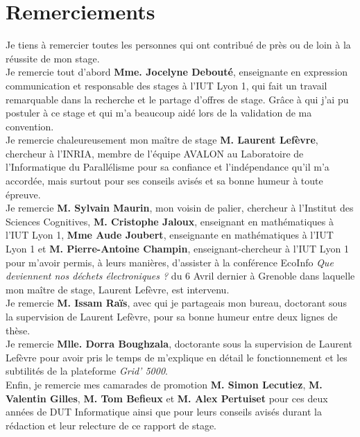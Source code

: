 \newpage
\thispagestyle{empty}
\section*{Remerciements}
Je tiens à remercier toutes les personnes qui ont contribué de près ou de loin à la réussite de mon stage. \\

Je remercie tout d'abord \textbf{Mme. Jocelyne Debouté}, enseignante en expression communication et responsable des stages à l'IUT Lyon 1, qui fait un travail remarquable dans la recherche et le partage d'offres de stage. Grâce à qui j'ai pu postuler à ce stage et qui m'a beaucoup aidé lors de la validation de ma convention. \\

Je remercie chaleureusement mon maître de stage \textbf{M. Laurent Lefèvre}, chercheur à l'INRIA, membre de l'équipe AVALON au Laboratoire de l'Informatique du Parallélisme pour sa confiance et l'indépendance qu'il m'a accordée, mais surtout pour ses conseils avisés et sa bonne humeur à toute épreuve.\\ 

Je remercie \textbf{M. Sylvain Maurin}, mon voisin de palier, chercheur à l'Institut des Sciences Cognitives, \textbf{M. Cristophe Jaloux}, enseignant en mathématiques à l'IUT Lyon 1, \textbf{Mme Aude Joubert}, enseignante en mathématiques à l'IUT Lyon 1 et \textbf{M. Pierre-Antoine Champin}, enseignant-chercheur à l'IUT Lyon 1 pour m'avoir permis, à leurs manières, d'assister à la conférence EcoInfo \emph{Que deviennent nos déchets électroniques ?} du 6 Avril dernier à Grenoble dans laquelle mon maître de stage, Laurent Lefèvre, est intervenu.\\

Je remercie \textbf{M. Issam Raïs}, avec qui je partageais mon bureau, doctorant sous la supervision de Laurent Lefèvre, pour sa bonne humeur entre deux lignes de thèse.\\

Je remercie \textbf{Mlle. Dorra Boughzala}, doctorante sous la supervision de Laurent Lefèvre pour avoir pris le temps de m'explique en détail le fonctionnement et les subtilités de la plateforme \emph{Grid' 5000}.\\

Enfin, je remercie mes camarades de promotion \textbf{M. Simon Lecutiez}, \textbf{M. Valentin Gilles}, \textbf{M. Tom Befieux} et \textbf{M. Alex Pertuiset} pour ces deux années de DUT Informatique ainsi que pour leurs conseils avisés durant la rédaction et leur relecture de ce rapport de stage.
